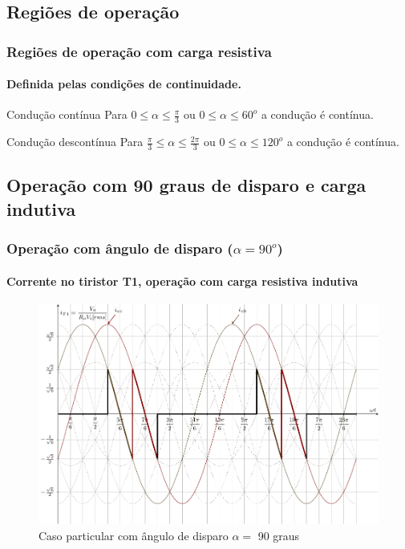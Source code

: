 \documentclass[aspectratio=43]{beamer}
\begin{document}
\subsection{Regiões de operação}
\begin{frame}
	\frametitle{Regiões de operação com carga resistiva}
	\framesubtitle{Definida pelas condições de continuidade.}
	\begin{block}{Condução contínua}
		 Para $ 0 \le \alpha \le \frac{\pi}{3}$ ou $ 0 \le \alpha \le 60^o$ a condução é contínua.
	\end{block}
		\begin{block}{Condução descontínua}
			Para $ \frac{\pi}{3} \le \alpha \le \frac{2\pi}{3}$ ou $ 0 \le \alpha \le 120^o$ a condução é contínua.
		\end{block}
\end{frame}








\subsection{Operação com 90 graus de disparo e carga indutiva}
\begin{frame}
	\frametitle{Operação com ângulo de disparo ($\alpha=90^o$)}
	\framesubtitle{Corrente no tiristor T1, operação com carga resistiva indutiva}
	
	\begin{figure}
		\centering
		\includegraphics[width=0.7\linewidth]{figuras/SenosDrawSEQnT1alphaRL}
		\caption{Caso particular com ângulo de disparo $\alpha =$ 90 graus}
		\label{fig:SenosDrawSEQnT1alphaRL}
	\end{figure}	
\end{frame}
\end{document}
